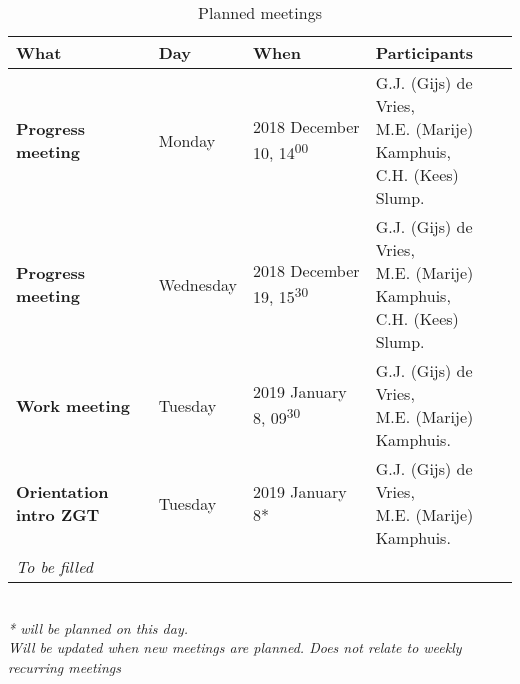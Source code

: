 \begin{table}[h!]
	\hspace*{-1.2cm}\begin{tabular}{p{29mm}|lll}
		\textbf{What} 		& 	Day	&	When	&	Participants \hfill \\
		\hline
		\textbf{Progress meeting} & Monday 		& 2018 December 10,	14\textsuperscript{00} &	 \makecell[l]{G.J. (Gijs) de Vries, \\M.E. (Marije) Kamphuis, \\C.H. (Kees) Slump.}\\
		\rowcolor{Gray}
		 \textbf{Progress meeting} & Wednesday 	& 2018 December 19,	15\textsuperscript{30} &	 \makecell[l]{G.J. (Gijs) de Vries, \\M.E. (Marije) Kamphuis, \\C.H. (Kees) Slump.}\\
		 \textbf{Work meeting} & Tuesday & 2019 January 8, 09\textsuperscript{30} & \makecell[l]{G.J. (Gijs) de Vries, \\M.E. (Marije) Kamphuis.} \\
		 \rowcolor{Gray}
		 \textbf{Orientation intro ZGT} \hfill & Tuesday & 2019 January 8* & \makecell[l]{G.J. (Gijs) de Vries, \\M.E. (Marije) Kamphuis.}\\
		  \textit{To be filled} & & & \\
		 \hline
	\end{tabular}\hspace*{-1.2cm} \\
	\textit{* will be planned on this day.}\\	
	\textit{Will be updated when new meetings are planned. Does not relate to weekly recurring meetings}
	\caption{Planned meetings}
	\label{tab:planned_meet}
\end{table}
